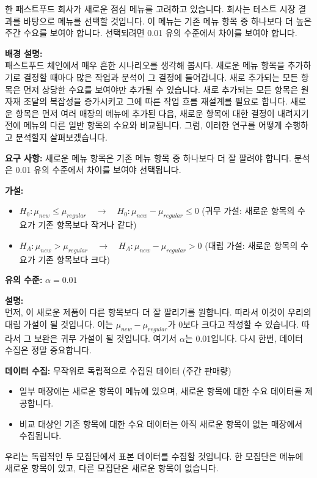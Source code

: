 \documentclass[11pt,a4paper]{book}
\theoremstyle{definition}
\begin{document}
\begin{examplebox}[title=제품 테스트 (1/5): 새로운 점심 메뉴 도입]
한 패스트푸드 회사가 새로운 점심 메뉴를 고려하고 있습니다. 회사는 테스트 시장 결과를 바탕으로 메뉴를 선택할 것입니다. 이 메뉴는 기존 메뉴 항목 중 하나보다 더 높은 주간 수요를 보여야 합니다. 선택되려면 0.01 유의 수준에서 차이를 보여야 합니다.

\textbf{배경 설명:} \\
패스트푸드 체인에서 매우 흔한 시나리오를 생각해 봅시다. 새로운 메뉴 항목을 추가하기로 결정할 때마다 많은 작업과 분석이 그 결정에 들어갑니다. 새로 추가되는 모든 항목은 먼저 상당한 수요를 보여야만 추가될 수 있습니다. 새로 추가되는 모든 항목은 원자재 조달의 복잡성을 증가시키고 그에 따른 작업 흐름 재설계를 필요로 합니다. 새로운 항목은 먼저 여러 매장의 메뉴에 추가된 다음, 새로운 항목에 대한 결정이 내려지기 전에 메뉴의 다른 일반 항목의 수요와 비교됩니다. 그럼, 이러한 연구를 어떻게 수행하고 분석할지 살펴보겠습니다.
\end{examplebox}

\begin{infobox}[title=제품 테스트 (2/5): 가설 설정 (새 메뉴)]
\textbf{요구 사항:} 새로운 메뉴 항목은 기존 메뉴 항목 중 하나보다 더 잘 팔려야 합니다. 분석은 0.01 유의 수준에서 차이를 보여야 선택됩니다.

\textbf{가설:}
\begin{itemize}
    \item $H_0 : \mu_{new} \le \mu_{regular} \quad \rightarrow \quad H_0 : \mu_{new} - \mu_{regular} \le 0$ (귀무 가설: 새로운 항목의 수요가 기존 항목보다 작거나 같다)
    \item $H_A : \mu_{new} > \mu_{regular} \quad \rightarrow \quad H_A : \mu_{new} - \mu_{regular} > 0$ (대립 가설: 새로운 항목의 수요가 기존 항목보다 크다)
\end{itemize}
\textbf{유의 수준:} $\alpha = 0.01$

\textbf{설명:} \\
먼저, 이 새로운 제품이 다른 항목보다 더 잘 팔리기를 원합니다. 따라서 이것이 우리의 대립 가설이 될 것입니다. 이는 $\mu_{new} - \mu_{regular}$가 0보다 크다고 작성할 수 있습니다. 따라서 그 보완은 귀무 가설이 될 것입니다. 여기서 $\alpha$는 0.01입니다. 다시 한번, 데이터 수집은 정말 중요합니다.
\end{infobox}

\begin{infobox}[title=제품 테스트 (3/5): 데이터 수집 방법]
\textbf{데이터 수집:} 무작위로 독립적으로 수집된 데이터 (주간 판매량)
\begin{itemize}
    \item 일부 매장에는 새로운 항목이 메뉴에 있으며, 새로운 항목에 대한 수요 데이터를 제공합니다.
    \item 비교 대상인 기존 항목에 대한 수요 데이터는 아직 새로운 항목이 없는 매장에서 수집됩니다.
\end{itemize}
우리는 독립적인 두 모집단에서 표본 데이터를 수집할 것입니다. 한 모집단은 메뉴에 새로운 항목이 있고, 다른 모집단은 새로운 항목이 없습니다.
\end{infobox}
\end{document}
